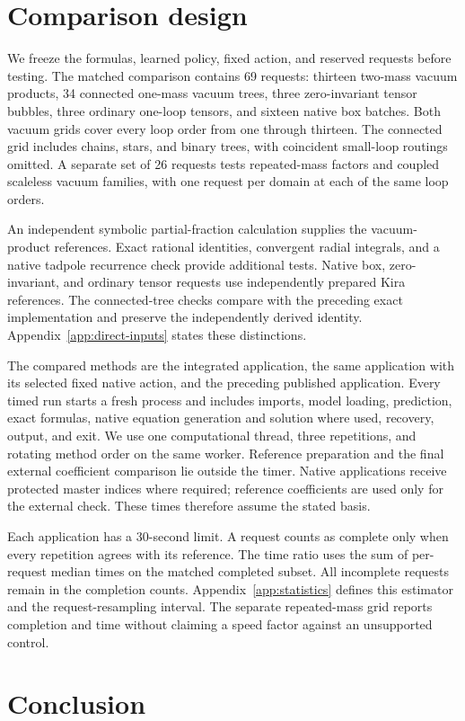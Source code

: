\documentclass[11pt,a4paper]{article}
\begin{document}
\section{Comparison design}
\label{sec:design}
We freeze the formulas, learned policy, fixed action, and reserved requests before testing. The matched comparison contains 69 requests: thirteen two-mass vacuum products, 34 connected one-mass vacuum trees, three zero-invariant tensor bubbles, three ordinary one-loop tensors, and sixteen native box batches. Both vacuum grids cover every loop order from one through thirteen. The connected grid includes chains, stars, and binary trees, with coincident small-loop routings omitted. A separate set of 26 requests tests repeated-mass factors and coupled scaleless vacuum families, with one request per domain at each of the same loop orders.

An independent symbolic partial-fraction calculation supplies the vacuum-product references. Exact rational identities, convergent radial integrals, and a native tadpole recurrence check provide additional tests. Native box, zero-invariant, and ordinary tensor requests use independently prepared Kira references. The connected-tree checks compare with the preceding exact implementation and preserve the independently derived identity. Appendix~\ref{app:direct-inputs} states these distinctions.

The compared methods are the integrated application, the same application with its selected fixed native action, and the preceding published application. Every timed run starts a fresh process and includes imports, model loading, prediction, exact formulas, native equation generation and solution where used, recovery, output, and exit. We use one computational thread, three repetitions, and rotating method order on the same worker. Reference preparation and the final external coefficient comparison lie outside the timer. Native applications receive protected master indices where required; reference coefficients are used only for the external check. These times therefore assume the stated basis.

Each application has a 30-second limit. A request counts as complete only when every repetition agrees with its reference. The time ratio uses the sum of per-request median times on the matched completed subset. All incomplete requests remain in the completion counts. Appendix~\ref{app:statistics} defines this estimator and the request-resampling interval. The separate repeated-mass grid reports completion and time without claiming a speed factor against an unsupported control.



\section{Conclusion}

\appendix







\end{document}
